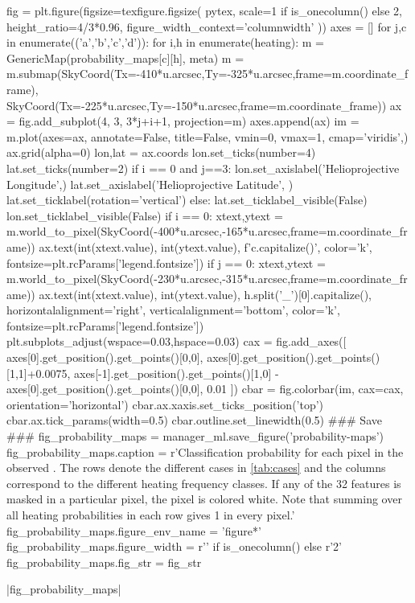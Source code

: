 \begin{pycode}[manager_ml]
fig = plt.figure(figsize=texfigure.figsize(
    pytex,
    scale=1 if is_onecolumn() else 2,
    height_ratio=4/3*0.96,
    figure_width_context='columnwidth'
))
axes = []
for j,c in enumerate(('a','b','c','d')):
    for i,h in enumerate(heating):
        m = GenericMap(probability_maps[c][h], meta)
        m = m.submap(SkyCoord(Tx=-410*u.arcsec,Ty=-325*u.arcsec,frame=m.coordinate_frame),
                     SkyCoord(Tx=-225*u.arcsec,Ty=-150*u.arcsec,frame=m.coordinate_frame))
        ax = fig.add_subplot(4, 3, 3*j+i+1, projection=m)
        axes.append(ax)
        im = m.plot(axes=ax, annotate=False, title=False, vmin=0, vmax=1, cmap='viridis',)
        ax.grid(alpha=0)
        lon,lat = ax.coords
        lon.set_ticks(number=4)
        lat.set_ticks(number=2)
        if i == 0 and j==3:
            lon.set_axislabel('Helioprojective Longitude',)
            lat.set_axislabel('Helioprojective Latitude', )
            lat.set_ticklabel(rotation='vertical')
        else:
            lat.set_ticklabel_visible(False)
            lon.set_ticklabel_visible(False)
        if i == 0:
            xtext,ytext = m.world_to_pixel(SkyCoord(-400*u.arcsec,-165*u.arcsec,frame=m.coordinate_frame))
            ax.text(int(xtext.value), int(ytext.value), f'{c.capitalize()}', color='k', fontsize=plt.rcParams['legend.fontsize'])
        if j == 0:
            xtext,ytext = m.world_to_pixel(SkyCoord(-230*u.arcsec,-315*u.arcsec,frame=m.coordinate_frame))
            ax.text(int(xtext.value), int(ytext.value),
                    h.split('_')[0].capitalize(),
                    horizontalalignment='right',
                    verticalalignment='bottom',
                    color='k', fontsize=plt.rcParams['legend.fontsize'])
plt.subplots_adjust(wspace=0.03,hspace=0.03)
cax = fig.add_axes([
    axes[0].get_position().get_points()[0,0],
    axes[0].get_position().get_points()[1,1]+0.0075,
    axes[-1].get_position().get_points()[1,0] - axes[0].get_position().get_points()[0,0],
    0.01
])
cbar = fig.colorbar(im, cax=cax, orientation='horizontal')
cbar.ax.xaxis.set_ticks_position('top')
cbar.ax.tick_params(width=0.5)
cbar.outline.set_linewidth(0.5)
### Save ###
fig_probability_maps = manager_ml.save_figure('probability-maps')
fig_probability_maps.caption = r'Classification probability for each pixel in the observed \AR{}. The rows denote the different cases in \autoref{tab:cases} and the columns correspond to the different heating frequency classes. If any of the 32 features is masked in a particular pixel, the pixel is colored white. Note that summing over all heating probabilities in each row gives 1 in every pixel.'
fig_probability_maps.figure_env_name = 'figure*'
fig_probability_maps.figure_width = r'\columnwidth' if is_onecolumn() else r'2\columnwidth'
fig_probability_maps.fig_str = fig_str
\end{pycode}
\py[manager_ml]|fig_probability_maps|

